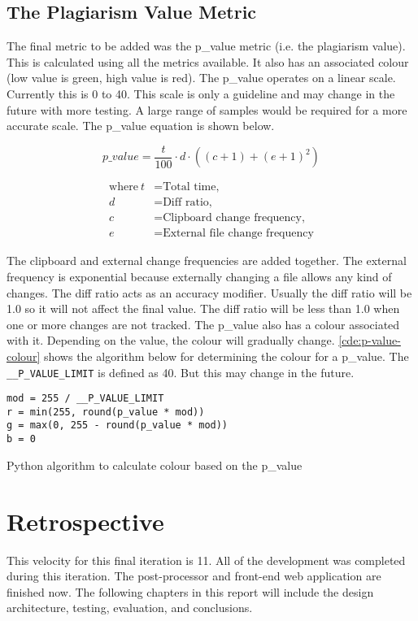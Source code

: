 \subsection{The Plagiarism Value Metric}
The final metric to be added was the p\_value metric (i.e. the plagiarism value). This is calculated using all the metrics available. It also has an associated colour (low value is green, high value is red). The p\_value operates on a linear scale. Currently this is 0 to 40. This scale is only a guideline and may change in the future with more testing. A large range of samples would be required for a more accurate scale. The p\_value equation is shown below.

\[
  p\_value = \frac{t}{100} \cdot d \cdot ((c + 1) + (e + 1)^2)
\]

\begin{align*}
  \text{where}~t &= \text{Total time,} \\
  d &= \text{Diff ratio,} \\
  c &= \text{Clipboard change frequency,} \\
  e &= \text{External file change frequency}
\end{align*}

The clipboard and external change frequencies are added together. The external frequency is exponential because externally changing a file allows any kind of changes. The diff ratio acts as an accuracy modifier. Usually the diff ratio will be 1.0 so it will not affect the final value. The diff ratio will be less than 1.0 when one or more changes are not tracked. The p\_value also has a colour associated with it. Depending on the value, the colour will gradually change. \autoref{cde:p-value-colour} shows the algorithm below for determining the colour for a p\_value. The \texttt{\_\_P\_VALUE\_LIMIT} is defined as 40. But this may change in the future.

\begin{code}
\begin{verbatim}
mod = 255 / __P_VALUE_LIMIT
r = min(255, round(p_value * mod))
g = max(0, 255 - round(p_value * mod))
b = 0
\end{verbatim}
\caption{Python algorithm to calculate colour based on the p\_value}
\label{cde:p-value-colour}
\end{code}

\section{Retrospective}
This velocity for this final iteration is 11. All of the development was completed during this iteration. The post-processor and front-end web application are finished now. The following chapters in this report will include the design architecture, testing, evaluation, and conclusions.
